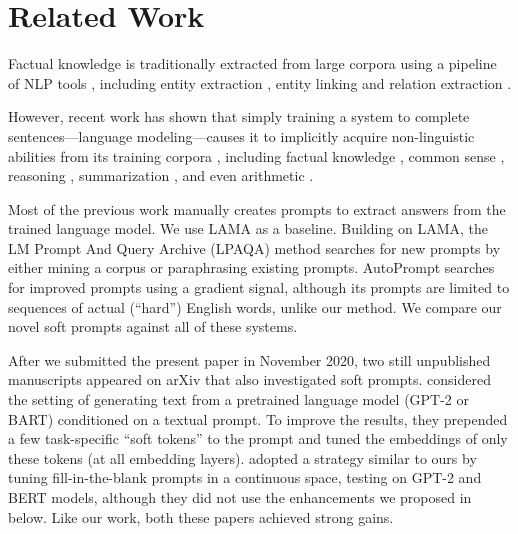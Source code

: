 \section{Related Work}

Factual knowledge is traditionally extracted from large corpora using a pipeline of NLP tools \citep{surdeanuOverviewEnglishSlot2014}, including entity extraction \citep{lampleNeuralArchitecturesNamed2016}, entity linking \citep{rao2013entity} and relation extraction \citep{sorokinContextAwareRepresentationsKnowledge2017}.

However, recent work has shown that simply training a system to complete sentences---language modeling---causes it to implicitly acquire non-linguistic abilities from its training corpora \citep{rogersPrimerBERTologyWhat2020}, including factual knowledge \citep{petroniLanguageModelsKnowledge2019,jiangHowCanWe2020}, common sense \citep{biskPIQAReasoningPhysical2019}, reasoning \citep{talmorOLMpicsWhatLanguage2020,brownLanguageModelsAre2020}, summarization \citep{radfordLanguageModelsAre2019}, and even arithmetic \citep{bouraouiInducingRelationalKnowledge2020}.

Most of the previous work manually creates prompts to extract answers from the trained language model.  We use LAMA \cite{petroniLanguageModelsKnowledge2019} as a baseline.  Building on LAMA, the LM Prompt And Query Archive (LPAQA) method \cite{jiangHowCanWe2020} searches for new prompts by either mining a corpus or paraphrasing existing prompts.  AutoPrompt \cite{shinAutoPromptElicitingKnowledge2020} searches for improved prompts using a gradient signal, although its prompts are limited to sequences of actual (``hard'') English words, unlike our method.  We compare our novel soft prompts against all of these systems.

After we submitted the present paper in November 2020, two still unpublished manuscripts appeared on arXiv that also investigated soft prompts.   considered the setting of generating text from a pretrained language model (GPT-2 or BART) conditioned on a textual prompt.  To improve the results, they prepended a few task-specific ``soft tokens'' to the prompt and tuned the embeddings of only these tokens (at all embedding layers).  \citet{liu2021gpt} adopted a strategy similar to ours by tuning fill-in-the-blank prompts in a continuous space, testing on GPT-2 and BERT models, although they did not use the enhancements we proposed in  below.  Like our work, both these papers achieved strong gains.

